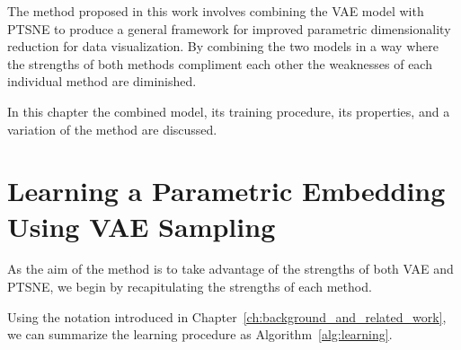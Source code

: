 The method proposed in this work involves combining the VAE model with PTSNE to produce a general framework for improved parametric dimensionality reduction for data visualization. By combining the two models in a way where the strengths of both methods compliment each other the weaknesses of each individual method are diminished.

In this chapter the combined model, its training procedure, its properties, and a variation of the method are discussed.

\section{Learning a Parametric Embedding Using VAE Sampling}

As the aim of the method is to take advantage of the strengths of both VAE and PTSNE, we begin by recapitulating the strengths of each method.


Using the notation introduced in Chapter~\ref{ch:background_and_related_work}, we can summarize the learning procedure as Algorithm~\ref{alg:learning}. 


